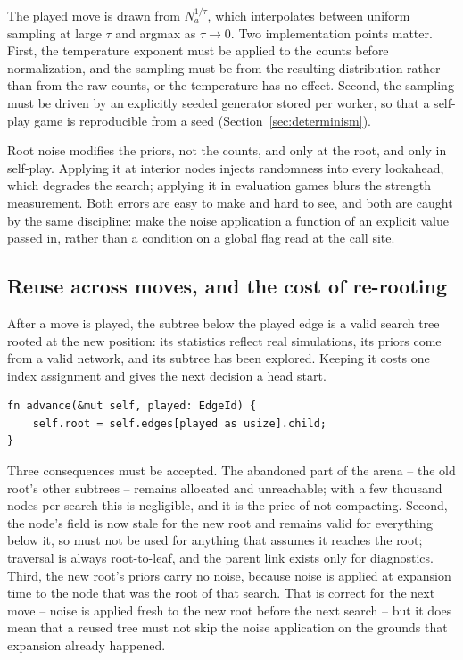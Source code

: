 The played move is drawn from $N_a^{1/\tau}$, which interpolates between uniform
sampling at large $\tau$ and argmax as $\tau \to 0$. Two implementation points
matter. First, the temperature exponent must be applied to the counts before
normalization, and the sampling must be from the resulting distribution rather
than from the raw counts, or the temperature has no effect. Second, the sampling
must be driven by an explicitly seeded generator stored per worker, so that a
self-play game is reproducible from a seed (Section~\ref{sec:determinism}).

Root noise modifies the priors, not the counts, and only at the root, and only in
self-play. Applying it at interior nodes injects randomness into every lookahead,
which degrades the search; applying it in evaluation games blurs the strength
measurement. Both errors are easy to make and hard to see, and both are caught by
the same discipline: make the noise application a function of an explicit
 value passed in, rather than a condition on a global flag read at the
call site.

\subsection{Reuse across moves, and the cost of re-rooting}
\label{sec:reroot}

After a move is played, the subtree below the played edge is a valid search tree
rooted at the new position: its statistics reflect real simulations, its priors
come from a valid network, and its subtree has been explored. Keeping it costs one
index assignment and gives the next decision a head start.

\begin{lstlisting}[style=rust,caption={Re-rooting. The arena is unchanged; only the
root moves.},label={lst:reroot}]
fn advance(&mut self, played: EdgeId) {
    self.root = self.edges[played as usize].child;
}
\end{lstlisting}

Three consequences must be accepted. The abandoned part of the arena -- the old
root's other subtrees -- remains allocated and unreachable; with a few thousand
nodes per search this is negligible, and it is the price of not compacting.
Second, the node's  field is now stale for the new root and remains
valid for everything below it, so  must not be used for anything
that assumes it reaches the root; traversal is always root-to-leaf, and the
parent link exists only for diagnostics. Third, the new root's priors carry no
noise, because noise is applied at expansion time to the node that was the root
of that search. That is correct for the next move -- noise is applied fresh to
the new root before the next search -- but it does mean that a reused tree must
not skip the noise application on the grounds that expansion already happened.

